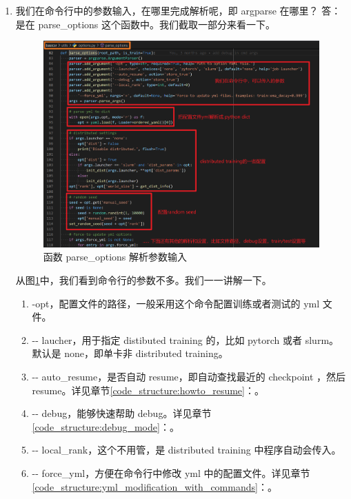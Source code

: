 \documentclass[../main.tex]{subfiles}
\begin{document}
\begin{enumerate}
    \item 我们在命令行中的参数输入，在哪里完成解析呢，即 argparse 在哪里？
          答：是在 parse\_options 这个函数中。我们截取一部分来看一下。

          \begin{figure}[ht]
              \begin{center}
                  \vspace{-0.2cm}
                  \includegraphics[width=0.85\linewidth]{figures/getting_start_parse_options.png}
                  \vspace{-0.3cm}
                  \caption{函数 parse\_options 解析参数输入}
                  \label{fig:getting_start_parse_options}
              \end{center}
              \vspace{-0.5cm}
          \end{figure}

          从图\ref{fig:getting_start_parse_options}中，我们看到命令行的参数不多。我们一一讲解一下。

          \begin{enumerate}
              \item {-}opt，配置文件的路径，一般采用这个命令配置训练或者测试的 yml 文件。
              \item {-}{-} laucher，用于指定 distibuted training 的，比如 pytorch 或者 slurm。默认是 none，即单卡非 distributed training。
              \item {-}{-} auto\_resume，是否自动 resume，即自动查找最近的 checkpoint ，然后 resume。详见章节\ref{code_structure:howto_resume}：。
              \item {-}{-} debug，能够快速帮助 debug。详见章节\ref{code_structure:debug_mode}：。
              \item {-}{-} local\_rank，这个不用管，是 distributed training 中程序自动会传入。
              \item {-}{-} force\_yml，方便在命令行中修改 yml 中的配置文件。详见章节\ref{code_structure:yml_modification_with_commands}：。
          \end{enumerate}



\end{enumerate}
\end{document}

